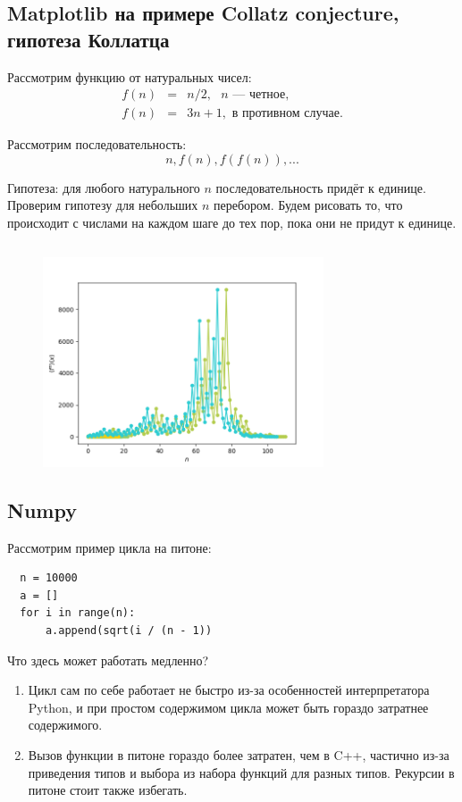 \documentclass{book}
\begin{document}
\subsection{Matplotlib на примере Collatz conjecture, гипотеза Коллатца}

Рассмотрим функцию от натуральных чисел:
\begin{eqnarray}
    f(n) & = & n / 2, \text{ $n$ --- четное}, \\
    f(n) & = & 3 n + 1, \text{ в противном случае}.
\end{eqnarray}

Рассмотрим последовательность:
\begin{equation}
  n, f(n), f(f(n)), ...
\end{equation}

Гипотеза: для любого натурального $n$ последовательность придёт к единице.
Проверим гипотезу для небольших $n$ перебором. Будем рисовать то, что происходит с числами на
каждом шаге до тех пор, пока они не придут к единице.

\inputminted{python}{collatz.py}

\begin{figure}[p]
  \centering
  \includegraphics[width=8.3cm]{collatz.png}
\end{figure}

\subsection{Numpy}

Рассмотрим пример цикла на питоне:
\begin{verbatim}
  n = 10000
  a = []
  for i in range(n):
      a.append(sqrt(i / (n - 1))
\end{verbatim}
Что здесь может работать медленно?
\begin{enumerate}
    \item Цикл сам по себе работает не быстро из-за особенностей интерпретатора
        Python, и при простом содержимом цикла может быть гораздо затратнее
        содержимого.
    \item Вызов функции в питоне гораздо более затратен, чем в C++, частично
        из-за приведения типов и выбора из набора функций для разных типов.
        Рекурсии в питоне стоит также избегать.
\end{enumerate}
\end{document}
